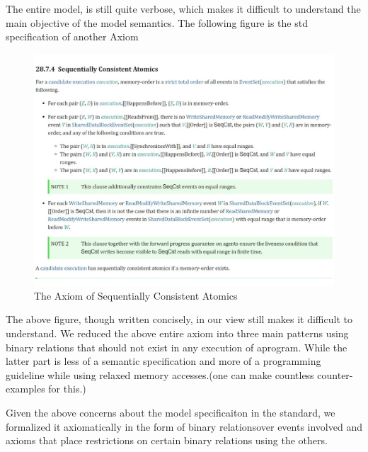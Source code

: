     The entire model, is still quite verbose, which makes it difficult to understand the main objective of the model semantics. 
    The following figure is the std specification of another Axiom 
    \begin{figure}[H]
        \centering 
        \includegraphics[scale=0.6]{4.ECMAScriptMemoryModel/ECMAScriptStdSeqCnsAt.pdf}
        \caption{The Axiom of Sequentially Consistent Atomics}
    \end{figure}
    The above figure, though written concisely, in our view still makes it difficult to understand. 
    We reduced the above entire axiom into three main patterns using binary relations that should not exist in any execution of aprogram. 
    While the latter part is less of a semantic specification and more of a programming guideline while using relaxed memory accesses.(one can make countless counter-examples for this.) 

Given the above concerns about the model specificaiton in the standard, we formalized it axiomatically in the form of binary relationsover events involved and axioms that place restrictions on certain binary relations using the others. 

